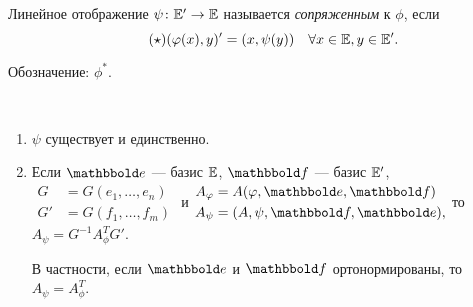 \begin{definition}
    Линейное отображение $\psi \colon \mathbb{E}' \to \mathbb{E}$ называется \textit{сопряженным} к $\phi$, если 
    \begin{equation*}
        \label{lec29:def}
        \tag{$\star$}
        (\phi(x), y)'  = (x, \psi(y)) \quad \forall x \in \EE, y \in \EE'
    .\end{equation*}

    Обозначение: $\phi^*$.
\end{definition}

\begin{proposal}~
    \begin{enumerate}
    \item $\psi$ существует и единственно.
    \item Если $\E$ --- базис $\mathbb{E}$, $\F$ --- базис $\mathbb{E}'$, 
        \begin{math}
            \begin{aligned}
                G &= G(e_1, \dots, e_n) \\
                G' &= G(f_1, \dots, f_m)
            \end{aligned}
        \end{math} и 
        \begin{math}
            \begin{aligned}
                A_\phi &= A(\phi, \E, \F) \\
                A_\psi &= (A, \psi, \F, \E),
            \end{aligned}
        \end{math} то $A_\psi = G^{-1} A_\phi^{T} G'$.

        В частности, если $\E$ и $\F$ ортонормированы, то $A_\psi = A_\phi^{T}$.
    \end{enumerate}
\end{proposal}


